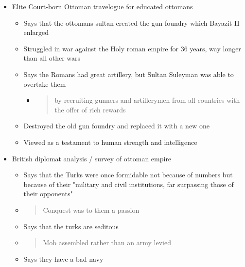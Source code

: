 \documentclass[letterpaper]{article}
\begin{document}
\begin{itemize}
\begin{itemize}
\item Elite Court-born Ottoman travelogue for educated ottomans

\begin{itemize}
\item Says that the ottomans sultan created the gun-foundry which
Bayazit II enlarged
\item Struggled in war against the Holy roman empire for 36 years, way
longer than all other wars
\item Says the Romans had great artillery, but Sultan Suleyman was able
to overtake them

\begin{itemize}
\item \begin{quote}
by recruiting gunners and artillerymen from all countries with
the offer of rich rewards
\end{quote}
\end{itemize}

\item Destroyed the old gun foundry and replaced it with a new one
\item Viewed as a testament to human strength and intelligence
\end{itemize}

\item British diplomat analysis / survey of ottoman empire

\begin{itemize}
\item Says that the Turks were once formidable not because of numbers
but because of their "military and civil institutions, far
surpassing those of their opponents"

\item \begin{quote}
Conquest was to them a passion
\end{quote}

\item Says that the turks are seditous

\item \begin{quote}
Mob assembled rather than an army levied
\end{quote}

\item Says they have a bad navy
\end{itemize}
\end{itemize}
\end{itemize}
\end{document}
